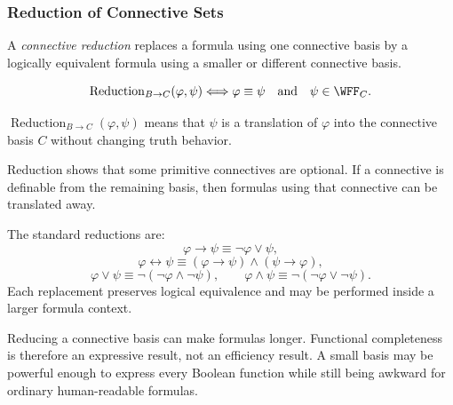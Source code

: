 \subsubsection*{Reduction of Connective Sets}

\begin{tcolorbox}[colback=propbox, colframe=propborder, arc=2pt,
  left=6pt, right=6pt, top=4pt, bottom=4pt,
  title={\small\textbf{Definition (Connective Reduction)}},
  fonttitle=\small\bfseries]
\begin{definition}
\label{def:connective-reduction-propositional-logic}
A \emph{connective reduction} replaces a formula using one connective basis by
a logically equivalent formula using a smaller or different connective basis.
\end{definition}
\end{tcolorbox}

\begin{remark*}
\[
\operatorname{Reduction}_{B\to C}(\varphi,\psi)
\Longleftrightarrow
\varphi\equiv\psi
\quad\text{and}\quad
\psi\in\WFF_C.
\]
\end{remark*}

\begin{remark*}
\(\operatorname{Reduction}_{B\to C}(\varphi,\psi)\) means that \(\psi\) is a
translation of \(\varphi\) into the connective basis \(C\) without changing truth
behavior.
\end{remark*}

\begin{remark*}[Interpretation]
Reduction shows that some primitive connectives are optional. If a connective is
definable from the remaining basis, then formulas using that connective can be
translated away.
\end{remark*}

\begin{remark*}[Exposition]
The standard reductions are:
\[
\varphi\to\psi\equiv\neg\varphi\lor\psi,
\]
\[
\varphi\leftrightarrow\psi
\equiv
(\varphi\to\psi)\land(\psi\to\varphi),
\]
\[
\varphi\lor\psi\equiv\neg(\neg\varphi\land\neg\psi),
\qquad
\varphi\land\psi\equiv\neg(\neg\varphi\lor\neg\psi).
\]
Each replacement preserves logical equivalence and may be performed inside a
larger formula context.
\end{remark*}

\begin{remark*}[Exposition]
Reducing a connective basis can make formulas longer. Functional completeness is
therefore an expressive result, not an efficiency result. A small basis may be
powerful enough to express every Boolean function while still being awkward for
ordinary human-readable formulas.
\end{remark*}

